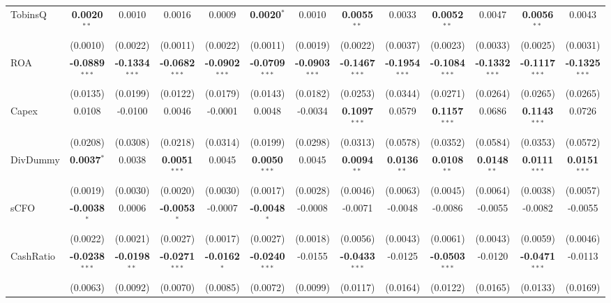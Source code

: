 \documentclass[11pt,a4paper]{article}
\begin{document}
\begin{table}[htbp]
\begin{tabular}{lcccccccccccc}
TobinsQ & \textbf{0.0020}$^{**}$ & 0.0010 & 0.0016 & 0.0009 & \textbf{0.0020}$^{*}$ & 0.0010 & \textbf{0.0055}$^{**}$ & 0.0033 & \textbf{0.0052}$^{**}$ & 0.0047 & \textbf{0.0056}$^{**}$ & 0.0043 \\
 & (0.0010) & (0.0022) & (0.0011) & (0.0022) & (0.0011) & (0.0019) & (0.0022) & (0.0037) & (0.0023) & (0.0033) & (0.0025) & (0.0031) \\
ROA & \textbf{-0.0889}$^{***}$ & \textbf{-0.1334}$^{***}$ & \textbf{-0.0682}$^{***}$ & \textbf{-0.0902}$^{***}$ & \textbf{-0.0709}$^{***}$ & \textbf{-0.0903}$^{***}$ & \textbf{-0.1467}$^{***}$ & \textbf{-0.1954}$^{***}$ & \textbf{-0.1084}$^{***}$ & \textbf{-0.1332}$^{***}$ & \textbf{-0.1117}$^{***}$ & \textbf{-0.1325}$^{***}$ \\
 & (0.0135) & (0.0199) & (0.0122) & (0.0179) & (0.0143) & (0.0182) & (0.0253) & (0.0344) & (0.0271) & (0.0264) & (0.0265) & (0.0265) \\
Capex & 0.0108 & -0.0100 & 0.0046 & -0.0001 & 0.0048 & -0.0034 & \textbf{0.1097}$^{***}$ & 0.0579 & \textbf{0.1157}$^{***}$ & 0.0686 & \textbf{0.1143}$^{***}$ & 0.0726 \\
 & (0.0208) & (0.0308) & (0.0218) & (0.0314) & (0.0199) & (0.0298) & (0.0313) & (0.0578) & (0.0352) & (0.0584) & (0.0353) & (0.0572) \\
DivDummy & \textbf{0.0037}$^{*}$ & 0.0038 & \textbf{0.0051}$^{***}$ & 0.0045 & \textbf{0.0050}$^{***}$ & 0.0045 & \textbf{0.0094}$^{**}$ & \textbf{0.0136}$^{**}$ & \textbf{0.0108}$^{**}$ & \textbf{0.0148}$^{**}$ & \textbf{0.0111}$^{***}$ & \textbf{0.0151}$^{***}$ \\
 & (0.0019) & (0.0030) & (0.0020) & (0.0030) & (0.0017) & (0.0028) & (0.0046) & (0.0063) & (0.0045) & (0.0064) & (0.0038) & (0.0057) \\
sCFO & \textbf{-0.0038}$^{*}$ & 0.0006 & \textbf{-0.0053}$^{*}$ & -0.0007 & \textbf{-0.0048}$^{*}$ & -0.0008 & -0.0071 & -0.0048 & -0.0086 & -0.0055 & -0.0082 & -0.0055 \\
 & (0.0022) & (0.0021) & (0.0027) & (0.0017) & (0.0027) & (0.0018) & (0.0056) & (0.0043) & (0.0061) & (0.0043) & (0.0059) & (0.0046) \\
CashRatio & \textbf{-0.0238}$^{***}$ & \textbf{-0.0198}$^{**}$ & \textbf{-0.0271}$^{***}$ & \textbf{-0.0162}$^{*}$ & \textbf{-0.0240}$^{***}$ & -0.0155 & \textbf{-0.0433}$^{***}$ & -0.0125 & \textbf{-0.0503}$^{***}$ & -0.0120 & \textbf{-0.0471}$^{***}$ & -0.0113 \\
 & (0.0063) & (0.0092) & (0.0070) & (0.0085) & (0.0072) & (0.0099) & (0.0117) & (0.0164) & (0.0122) & (0.0165) & (0.0133) & (0.0169) \\

\end{tabular}
\end{table}
\end{document}
